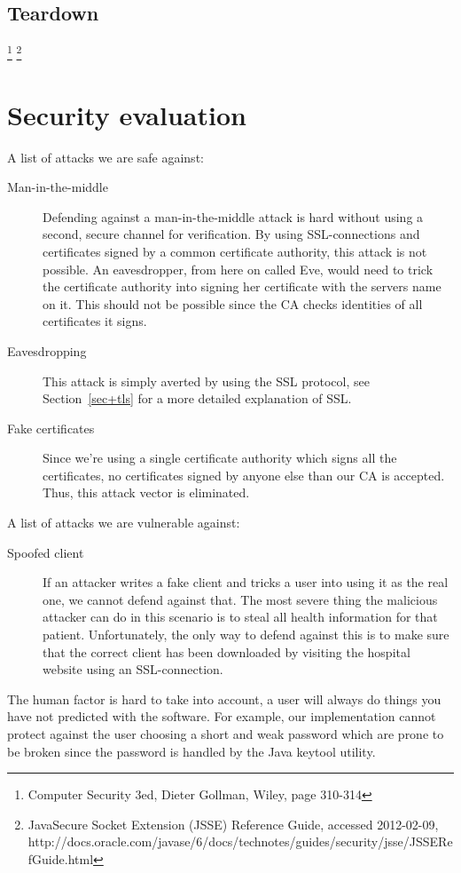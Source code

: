 \documentclass[10pt, a4paper]{article}
\begin{document}
\subsection{Teardown}


\footnote{Computer Security 3ed, Dieter Gollman, Wiley, page 310-314}
\footnote{Java\textregistered Secure Socket Extension (JSSE) Reference Guide, accessed 2012-02-09, http://docs.oracle.com/javase/6/docs/technotes/guides/security/jsse/JSSERefGuide.html}


\section{Security evaluation}
A list of attacks we are safe against:
\begin{description}
\item[Man-in-the-middle] Defending against a man-in-the-middle attack is hard without using a second, secure channel for verification. By using SSL-connections and certificates signed by a common certificate authority, this attack is not possible. An eavesdropper, from here on called Eve, would need to trick the certificate authority into signing her certificate with the servers name on it. This should not be possible since the CA checks identities of all certificates it signs.
\item[Eavesdropping] This attack is simply averted by using the SSL protocol, see Section~\ref{sec+tls} for a more detailed explanation of SSL.
\item[Fake certificates] Since we're using a single certificate authority which signs all the certificates, no certificates signed by anyone else than our CA is accepted. Thus, this attack vector is eliminated.
\end{description}

A list of attacks we are vulnerable against:
\begin{description}
\item[Spoofed client] If an attacker writes a fake client and tricks a user into using it as the real one, we cannot defend against that. The most severe thing the malicious attacker can do in this scenario is to steal all health information for that patient. Unfortunately, the only way to defend against this is to make sure that the correct client has been downloaded by visiting the hospital website using an SSL-connection.
\item[]
\end{description}

The human factor is hard to take into account, a user will always do things you have not predicted with the software. For example, our implementation cannot protect against the user choosing a short and weak password which are prone to be broken since the password is handled by the Java keytool utility.
\end{document}
